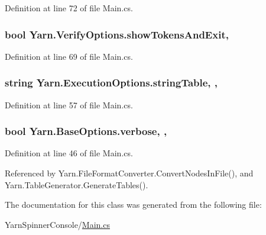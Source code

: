 Definition at line 72 of file Main.\-cs.

\hypertarget{a00171_ab1a387df201e3e136c15e5744219628d}{
\subsubsection[{show\-Tokens\-And\-Exit}]{\setlength{\rightskip}{0pt plus 5cm}bool Yarn.\-Verify\-Options.\-show\-Tokens\-And\-Exit\hspace{0.3cm}{\ttfamily [get]}, {\ttfamily [set]}}}\label{a00171_ab1a387df201e3e136c15e5744219628d}


Definition at line 69 of file Main.\-cs.

\hypertarget{a00101_a7e43c3b73722956cb0f5d507e4eef527}{
\subsubsection[{string\-Table}]{\setlength{\rightskip}{0pt plus 5cm}string Yarn.\-Execution\-Options.\-string\-Table\hspace{0.3cm}{\ttfamily [get]}, {\ttfamily [set]}, {\ttfamily [inherited]}}}\label{a00101_a7e43c3b73722956cb0f5d507e4eef527}


Definition at line 57 of file Main.\-cs.

\hypertarget{a00042_ada4d83d1756918f362d55f6649b82b17}{
\subsubsection[{verbose}]{\setlength{\rightskip}{0pt plus 5cm}bool Yarn.\-Base\-Options.\-verbose\hspace{0.3cm}{\ttfamily [get]}, {\ttfamily [set]}, {\ttfamily [inherited]}}}\label{a00042_ada4d83d1756918f362d55f6649b82b17}


Definition at line 46 of file Main.\-cs.



Referenced by Yarn.\-File\-Format\-Converter.\-Convert\-Nodes\-In\-File(), and Yarn.\-Table\-Generator.\-Generate\-Tables().



The documentation for this class was generated from the following file\-:\begin{DoxyCompactItemize}
\item 
Yarn\-Spinner\-Console/\hyperlink{a00303}{Main.\-cs}\end{DoxyCompactItemize}
